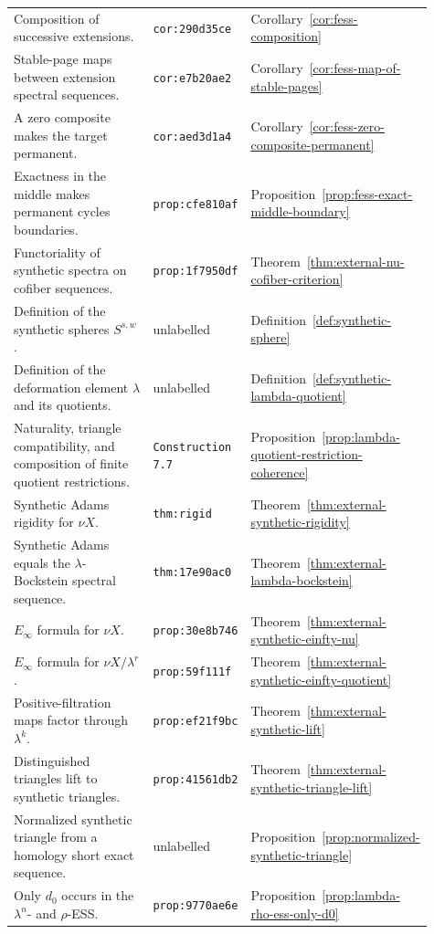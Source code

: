 \begin{center}
\begin{tabular}{p{0.49\linewidth}p{0.17\linewidth}p{0.25\linewidth}}
Composition of successive extensions. & \texttt{cor:290d35ce} & Corollary~\ref{cor:fess-composition} \\
Stable-page maps between extension spectral sequences. & \texttt{cor:e7b20ae2} & Corollary~\ref{cor:fess-map-of-stable-pages} \\
A zero composite makes the target permanent. & \texttt{cor:aed3d1a4} & Corollary~\ref{cor:fess-zero-composite-permanent} \\
Exactness in the middle makes permanent cycles boundaries. & \texttt{prop:cfe810af} & Proposition~\ref{prop:fess-exact-middle-boundary} \\
Functoriality of synthetic spectra on cofiber sequences. & \texttt{prop:1f7950df} & Theorem~\ref{thm:external-nu-cofiber-criterion} \\
Definition of the synthetic spheres $S^{s,w}$. & unlabelled & Definition~\ref{def:synthetic-sphere} \\
Definition of the deformation element $\lambda$ and its quotients. & unlabelled & Definition~\ref{def:synthetic-lambda-quotient} \\
Naturality, triangle compatibility, and composition of finite quotient restrictions. & \texttt{Construction 7.7} & Proposition~\ref{prop:lambda-quotient-restriction-coherence} \\
Synthetic Adams rigidity for $\nu X$. & \texttt{thm:rigid} & Theorem~\ref{thm:external-synthetic-rigidity} \\
Synthetic Adams equals the $\lambda$-Bockstein spectral sequence. & \texttt{thm:17e90ac0} & Theorem~\ref{thm:external-lambda-bockstein} \\
$E_\infty$ formula for $\nu X$. & \texttt{prop:30e8b746} & Theorem~\ref{thm:external-synthetic-einfty-nu} \\
$E_\infty$ formula for $\nu X/\lambda^r$. & \texttt{prop:59f111f} & Theorem~\ref{thm:external-synthetic-einfty-quotient} \\
Positive-filtration maps factor through $\lambda^k$. & \texttt{prop:ef21f9bc} & Theorem~\ref{thm:external-synthetic-lift} \\
Distinguished triangles lift to synthetic triangles. & \texttt{prop:41561db2} & Theorem~\ref{thm:external-synthetic-triangle-lift} \\
Normalized synthetic triangle from a homology short exact sequence. & unlabelled & Proposition~\ref{prop:normalized-synthetic-triangle} \\
Only $d_0$ occurs in the $\lambda^n$- and $\rho$-ESS. & \texttt{prop:9770ae6e} & Proposition~\ref{prop:lambda-rho-ess-only-d0} \\

\end{tabular}
\end{center}
